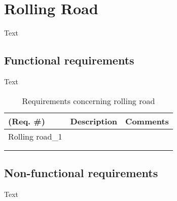 \section{Rolling Road}
Text

\subsection{Functional requirements}
Text

\begin{table}[h!]
	\centering
	\label{my-label}
	\begin{tabular}{|p{2 cm}|p{4 cm}|p{3 cm}|}
	\textbf{(Req. \#)} & \textbf{Description} & \textbf{Comments} \\\hline
	Rolling road_1	&  &  &  \\\hline
		&  &  &  \\\hline
		&  &  &  \\\hline
	\end{tabular}
	\caption{Requirements concerning rolling road}
\end{table}

\subsection{Non-functional requirements}
Text
